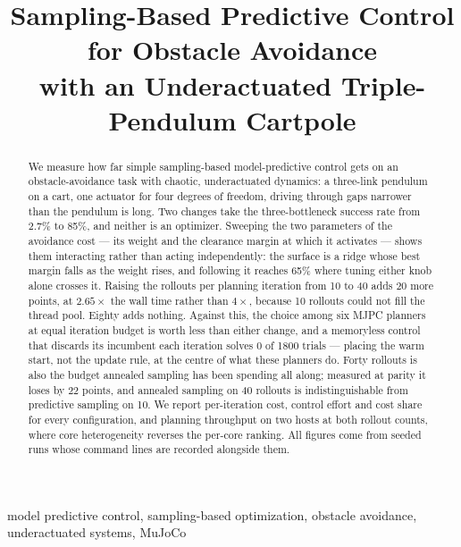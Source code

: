 \documentclass[conference]{IEEEtran}
\begin{document}
\title{Sampling-Based Predictive Control for Obstacle Avoidance\\
with an Underactuated Triple-Pendulum Cartpole}

\author{
}

\maketitle

\begin{abstract}
We measure how far simple sampling-based model-predictive control gets on an
obstacle-avoidance task with chaotic, underactuated dynamics: a three-link
pendulum on a cart, one actuator for four degrees of freedom, driving through
gaps narrower than the pendulum is long. Two changes take the three-bottleneck
success rate from 2.7\% to 85\%, and neither is an optimizer. Sweeping the two
parameters of the avoidance cost --- its weight and the clearance margin at
which it activates --- shows them interacting rather than acting independently:
the surface is a ridge whose best margin falls as the weight rises, and
following it reaches 65\% where tuning either knob alone crosses it. Raising the
rollouts per planning iteration from 10 to 40 adds 20 more points, at
$2.65\times$ the wall time rather than $4\times$, because 10 rollouts could not
fill the thread pool. Eighty adds nothing. Against this, the choice among six
MJPC planners at equal iteration budget is worth less than either change, and a
memoryless control that discards its incumbent each iteration solves 0 of 1800
trials --- placing the warm start, not the update rule, at the centre of what
these planners do. Forty rollouts is also the budget annealed sampling has been
spending all along; measured at parity it loses by 22 points, and annealed
sampling on 40 rollouts is indistinguishable from predictive sampling on 10. We
report per-iteration cost, control effort and cost share for every
configuration, and planning throughput on two hosts at both rollout counts,
where core heterogeneity reverses the per-core ranking. All figures come from
seeded runs whose command lines are recorded alongside them.
\end{abstract}

\begin{IEEEkeywords}
model predictive control, sampling-based optimization, obstacle avoidance,
underactuated systems, MuJoCo
\end{IEEEkeywords}
\end{document}
